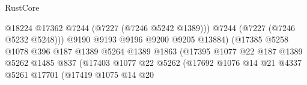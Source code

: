 \begin{lexlean}{RustCore}
\begin{coremodule}
                                                      @18224
                                                      @17362
                                                      @7244
                                                      (@7227 (@7246 @5242 @1389)))
                                                    @7244
                                                    (@7227 (@7246 @5232 @5248)))
                                                  @9190
                                                  @9193
                                                  @9196
                                                  @9200
                                                  @9205
                                                  @13884)
                                                (@17385
                                                  @5258
                                                  @1078
                                                  @396
                                                  @187
                                                  @1389
                                                  @5264
                                                  @1389
                                                  @1863
                                                  (@17395
                                                    @1077
                                                    @22
                                                    @187
                                                    @1389
                                                    @5262
                                                    @1485
                                                    @837
                                                    (@17403
                                                      @1077
                                                      @22
                                                      @5262
                                                      (@17692
                                                        @1076
                                                        @14
                                                        @21
                                                        @4337
                                                        @5261
                                                        @17701
                                                        (@17419
                                                          @1075
                                                          @14
                                                          @20

\end{coremodule}
\end{lexlean}
